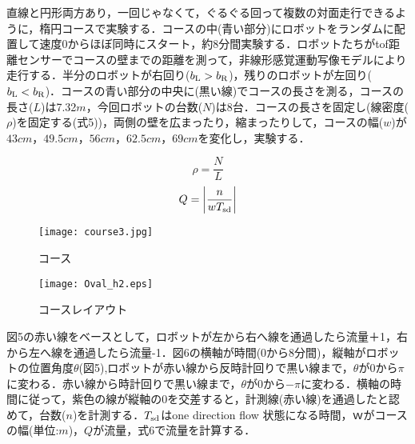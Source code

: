 直線と円形両方あり，一回じゃなくて，ぐるぐる回って複数の対面走行できるように，楕円コースで実験する．コースの中(青い部分)にロボットをランダムに配置して速度0からほぼ同時にスタート，約8分間実験する．ロボットたちがtof距離センサーでコースの壁までの距離を測って，非線形感覚運動写像モデルにより走行する．半分のロボットが右回り($b_{\rm L}>b_{\rm R}$)，残りのロボットが左回り($b_{\rm L}<b_{\rm R}$)．コースの青い部分の中央に(黒い線)でコースの長さを測る，コースの長さ($L$)は7.32$m$，今回ロボットの台数($N$)は8台．コースの長さを固定し(線密度($\rho$)を固定する(式5))，両側の壁を広まったり，縮まったりして，コースの幅($w$)が$43cm$，$49.5cm$，$56cm$，$62.5cm$，$69cm$を変化し，実験する．

\begin{equation}
\rho = \frac{N}{L}
\end{equation}
\begin{equation}
Q = \left| \frac{n}{wT_{\rm sd}} \right|
\end{equation}

\begin{figure}[h]
    \begin{minipage}{0.48\linewidth}
        \centering
        \texttt{[image: course3.jpg]}
        \caption{コース}
    \end{minipage}
    \begin{minipage}{0.48\linewidth}
        \centering
        \texttt{[image: Oval\_h2.eps]}
        \caption{コースレイアウト}
    \end{minipage}
\end{figure}



図5の赤い線をベースとして，ロボットが左から右へ線を通過したら流量＋1，右から左へ線を通過したら流量-1．図6の横軸が時間(0から8分間)，縦軸がロボットの位置角度$\theta$(図5),ロボットが赤い線から反時計回りで黒い線まで，$\theta$が0から$\pi$に変わる．赤い線から時計回りで黒い線まで，$\theta$が0から$-\pi$に変わる．横軸の時間に従って，紫色の線が縦軸の0を交差すると，計測線(赤い線)を通過したと認めて，台数($n$)を計測する．$T_{\rm sd}$はone direction flow 状態になる時間，$ｗ$がコースの幅(単位:$m$)，$Q$が流量，式6で流量を計算する．

